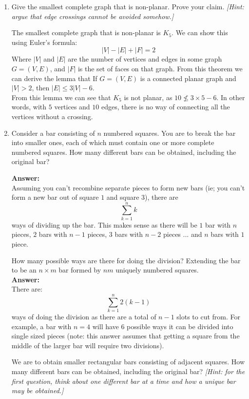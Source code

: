 \documentclass[a4paper,12pt]{article}
\begin{document}
\begin{enumerate}
\item
Give the smallest complete graph that is non-planar. Prove your claim. \textit{[Hint: argue that edge crossings cannot be avoided somehow.]}

	The smallest complete graph that is non-planar is $K_5$. We can show this using Euler's formula:
		$$ |V| - |E| + |F| = 2 $$
	Where $|V|$  and $|E|$ are the number of vertices and edges in some graph $G = (V, E)$, and $|F|$ is the set of faces on that graph. From this theorem we can derive the lemma that If $G = (V, E)$ is a			         connected planar graph and $|V | > 2$, then $|E| \leq 3|V| - 6$. \\	
	
	From this lemma we can see that $K_5$ is not planar, as $10 \nleq  3 \times 5 - 6$. In other words, with $5$ vertices and $10$ edges, there is no way of connecting all the vertices without a crossing. 


\item
Consider a bar consisting of $n$ numbered squares. You are to break the bar into smaller ones, each of which must contain one or more complete numbered squares. 
 How many different bars can be obtained, including the original bar? 
	
	\textbf{Answer:} \\
	Assuming you can't recombine separate pieces to form new bars (ie; you can't form a new bar out of square $1$ and square $3$), there are \[\sum_{k = 1}^{n}k\] ways of dividing up the bar. This makes sense as there will be $1$ bar with $n$ pieces, $2$ bars with $n - 1$ pieces, $3$ bars with $n - 2$ pieces $...$ and $n$ bars with $1$ piece. 
	
 How many possible ways are there for doing the division? Extending the bar to be an $n \times m$ bar formed by $nm$ uniquely numbered squares. \\
	\textbf{Answer:} \\
	There are: \[\sum_{k = 1}^{n}2(k - 1)\] ways of doing the division as there are a total of $n - 1$ slots to cut from. For example, a bar with $n = 4$ will have 6 possible ways it can be divided into single sized pieces (note: this answer assumes that getting a square from the middle of the larger bar will require two divisions). 
	
 We are to obtain smaller rectangular bars consisting of adjacent squares.  How many different bars can be obtained, including the original bar? \textit{[Hint: for the first
question, think about one different bar at a time and how a unique bar may be obtained.]} \\
	

\end{enumerate}
\end{document}
